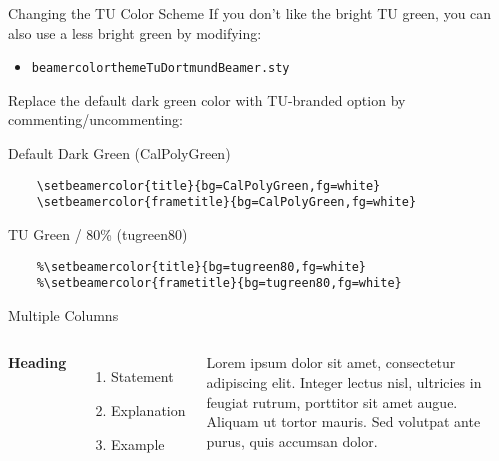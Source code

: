 \documentclass[aspectratio=169,xcolor=dvipsnames]{beamer}
\begin{document}
\begin{frame}[fragile]{Changing the TU Color Scheme}
    If you don’t like the bright TU green, you can also use a less bright green by modifying:

    \begin{itemize}
        \item \texttt{beamercolorthemeTuDortmundBeamer.sty}
    \end{itemize}

Replace the default dark green color with TU-branded option by commenting/uncommenting:

\begin{block}{Default Dark Green (CalPolyGreen)}
    \begin{verbatim}
    \setbeamercolor{title}{bg=CalPolyGreen,fg=white}
    \setbeamercolor{frametitle}{bg=CalPolyGreen,fg=white}
    \end{verbatim}
\end{block}

\begin{block}{TU Green / 80\% (tugreen80)}
    \begin{verbatim}
    %\setbeamercolor{title}{bg=tugreen80,fg=white}
    %\setbeamercolor{frametitle}{bg=tugreen80,fg=white}
    \end{verbatim}
\end{block}
\end{frame}
\endgroup


\begin{frame}
    \begingroup
    \titlepage
    \endgroup
\end{frame}


\begin{frame}{Multiple Columns}
    \begin{columns}[c] %

        \textbf{Heading}
        \begin{enumerate}
            \item Statement
            \item Explanation
            \item Example
        \end{enumerate}

        Lorem ipsum dolor sit amet, consectetur adipiscing elit. Integer lectus nisl, ultricies in feugiat rutrum, porttitor sit amet augue. Aliquam ut tortor mauris. Sed volutpat ante purus, quis accumsan dolor.

    \end{columns}
\end{frame}
\end{document}
